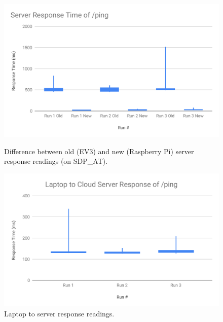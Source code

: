 \documentclass[a4paper]{article}
\begin{document}
\begin{center}
\begin{figure}[!htb]
  \includegraphics[width=\linewidth]{serv_resp.pdf}
  \caption{Difference between old (EV3) and new (Raspberry Pi) server response readings (on SDP\_AT).}\label{fig:awesome_image1}
\endminipage\hfill
     \includegraphics[width=\textwidth]{lap_serv.pdf}
     \caption{Laptop to server response readings.}\label{fig:awesome_image2}
\endminipage
\newline
\end{figure}

\end{center}
  
\end{document}
